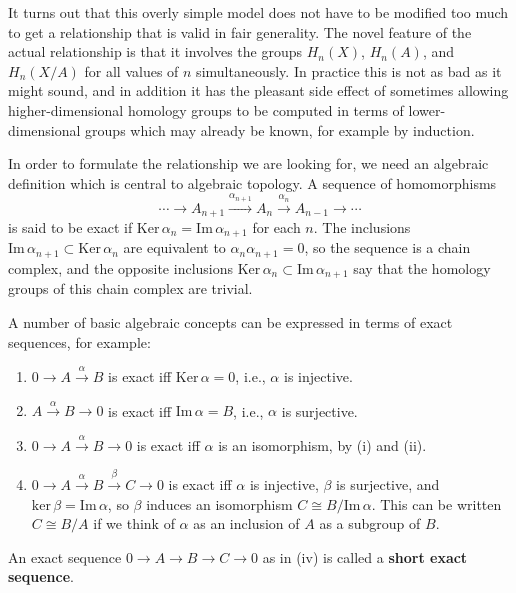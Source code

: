 It turns out that this overly simple model does not have to be modified too much
to get a relationship that is valid in fair generality. The novel feature of the actual
relationship is that it involves the groups $H_n(X)$, $H_n(A)$, and $H_n(X/A)$ for all values
of $n$ simultaneously. In practice this is not as bad as it might sound, and in addition
it has the pleasant side effect of sometimes allowing higher-dimensional homology
groups to be computed in terms of lower-dimensional groups which may already be
known, for example by induction.

In order to formulate the relationship we are looking for, we need an algebraic
definition which is central to algebraic topology. A sequence of homomorphisms
$$\cdots \to A_{n+1} \xrightarrow{\alpha_{n+1}} A_n \xrightarrow{\alpha_n} A_{n-1} \to \cdots$$
is said to be exact if $\text{Ker}\,\alpha_n = \text{Im}\,\alpha_{n+1}$ for each $n$. The inclusions $\text{Im}\,\alpha_{n+1} \subset \text{Ker}\,\alpha_n$
are equivalent to $\alpha_n\alpha_{n+1} = 0$, so the sequence is a chain complex, and the opposite
inclusions $\text{Ker}\,\alpha_n \subset \text{Im}\,\alpha_{n+1}$ say that the homology groups of this chain complex are
trivial.

A number of basic algebraic concepts can be expressed in terms of exact sequences, for example:

\begin{enumerate}
\item[{\rm (i)}] $0 \to A \xrightarrow{\alpha} B$ is exact iff $\text{Ker}\,\alpha = 0$, i.e., $\alpha$ is injective.
\item[{\rm (ii)}] $A \xrightarrow{\alpha} B \to 0$ is exact iff $\text{Im}\,\alpha = B$, i.e., $\alpha$ is surjective.
\item[{\rm (iii)}] $0 \to A \xrightarrow{\alpha} B \to 0$ is exact iff $\alpha$ is an isomorphism, by (i) and (ii).
\item[{\rm (iv)}] $0 \to A \xrightarrow{\alpha} B \xrightarrow{\beta} C \to 0$ is exact iff $\alpha$ is injective, $\beta$ is surjective, and $\text{ker}\,\beta =
\text{Im}\,\alpha$, so $\beta$ induces an isomorphism $C \cong B/\text{Im}\,\alpha$. This can be written $C \cong B/A$ if
we think of $\alpha$ as an inclusion of $A$ as a subgroup of $B$.
\end{enumerate}

An exact sequence $0 \to A \to B \to C \to 0$ as in (iv) is called a \textbf{short exact sequence}.

